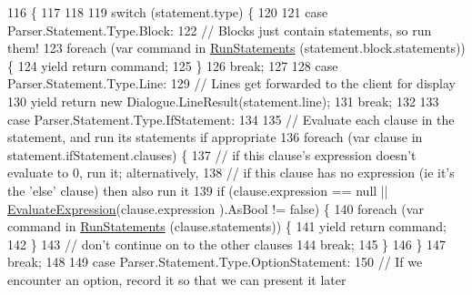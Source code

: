 \begin{DoxyCode}
116                                                                                              \{
117 
118 
119             \textcolor{keywordflow}{switch} (statement.type) \{
120 
121             \textcolor{keywordflow}{case} Parser.Statement.Type.Block:
122                 \textcolor{comment}{// Blocks just contain statements, so run them!}
123                 \textcolor{keywordflow}{foreach} (var command \textcolor{keywordflow}{in} \hyperlink{a00097_aa436557ec45c8e98d194d9af139d9170}{RunStatements} (statement.block.statements)) \{
124                     yield \textcolor{keywordflow}{return} command;
125                 \}
126                 \textcolor{keywordflow}{break};
127 
128             \textcolor{keywordflow}{case} Parser.Statement.Type.Line:
129                 \textcolor{comment}{// Lines get forwarded to the client for display}
130                 yield \textcolor{keywordflow}{return} \textcolor{keyword}{new} Dialogue.LineResult(statement.line);
131                 \textcolor{keywordflow}{break};
132 
133             \textcolor{keywordflow}{case} Parser.Statement.Type.IfStatement:
134 
135                 \textcolor{comment}{// Evaluate each clause in the statement, and run its statements if appropriate}
136                 \textcolor{keywordflow}{foreach} (var clause \textcolor{keywordflow}{in} statement.ifStatement.clauses) \{
137                     \textcolor{comment}{// if this clause's expression doesn't evaluate to 0, run it; alternatively,}
138                     \textcolor{comment}{// if this clause has no expression (ie it's the 'else' clause) then also run it}
139                     \textcolor{keywordflow}{if} (clause.expression == null || \hyperlink{a00097_ac57271c72da4ec456a32c94d951c8b65}{EvaluateExpression}(clause.expression
      ).AsBool != \textcolor{keyword}{false}) \{
140                         \textcolor{keywordflow}{foreach} (var command \textcolor{keywordflow}{in}  \hyperlink{a00097_aa436557ec45c8e98d194d9af139d9170}{RunStatements} (clause.statements)) \{
141                             yield \textcolor{keywordflow}{return} command;
142                         \}
143                         \textcolor{comment}{// don't continue on to the other clauses}
144                         \textcolor{keywordflow}{break};
145                     \}
146                 \}
147                 \textcolor{keywordflow}{break};
148 
149             \textcolor{keywordflow}{case} Parser.Statement.Type.OptionStatement:
150                 \textcolor{comment}{// If we encounter an option, record it so that we can present it later}

\end{DoxyCode}
